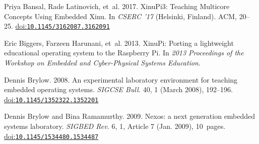 \begin{thebibliography}{11}

\ifx \showCODEN    \undefined {}     \fi
\ifx \showISBNx    \undefined \def \showISBNx     #1{\unskip}     \fi
\ifx \showISBNxiii \undefined \def \showISBNxiii  #1{\unskip}     \fi
\ifx \showISSN     \undefined \def \showISSN      #1{\unskip}     \fi
\ifx \showLCCN     \undefined \def \showLCCN      #1{\unskip}     \fi
\ifx \shownote     \undefined \def \shownote      #1{#1}          \fi
\ifx \showarticletitle \undefined \def \showarticletitle #1{#1}   \fi
\ifx \showURL      \undefined \def \showURL       {\relax}        \fi

\providecommand\bibfield[2]{#2}
\providecommand\bibinfo[2]{#2}
\providecommand\natexlab[1]{#1}
\providecommand\showeprint[2][]{arXiv:#2}

\bibfield{author}{\bibinfo{person}{Priya Bansal}, \bibinfo{person}{Rade Latinovich}, \bibinfo{person}{et~al}.} \bibinfo{year}{2017}\natexlab{}.
\newblock \showarticletitle{XinuPi3: Teaching Multicore Concepts Using Embedded Xinu}. In \bibinfo{booktitle}{\emph{CSERC '17}} (Helsinki, Finland). \bibinfo{publisher}{ACM}, \bibinfo{pages}{20–25}.
\newblock
\showISBNx{9781450363389}
\href{https://doi.org/10.1145/3162087.3162091}{doi:\nolinkurl{10.1145/3162087.3162091}}


\bibfield{author}{\bibinfo{person}{Eric Biggers}, \bibinfo{person}{Farzeen Harunani}, \bibinfo{person}{et~al}.} \bibinfo{year}{2013}\natexlab{}.
\newblock \showarticletitle{XinuPi: Porting a lightweight educational operating system to the Raspberry Pi}. In \bibinfo{booktitle}{\emph{2013 Proceedings of the Workshop on Embedded and Cyber-Physical Systems Education}}.
\newblock


\bibfield{author}{\bibinfo{person}{Dennis Brylow}.} \bibinfo{year}{2008}\natexlab{}.
\newblock \showarticletitle{An experimental laboratory environment for teaching embedded operating systems}.
\newblock \bibinfo{journal}{\emph{SIGCSE Bull.}} \bibinfo{volume}{40}, \bibinfo{number}{1} (\bibinfo{date}{March} \bibinfo{year}{2008}), \bibinfo{pages}{192–196}.
\newblock
\showISSN{0097-8418}
\href{https://doi.org/10.1145/1352322.1352201}{doi:\nolinkurl{10.1145/1352322.1352201}}


\bibfield{author}{\bibinfo{person}{Dennis Brylow} {and} \bibinfo{person}{Bina Ramamurthy}.} \bibinfo{year}{2009}\natexlab{}.
\newblock \showarticletitle{Nexos: a next generation embedded systems laboratory}.
\newblock \bibinfo{journal}{\emph{SIGBED Rev.}} \bibinfo{volume}{6}, \bibinfo{number}{1}, Article \bibinfo{articleno}{7} (\bibinfo{date}{Jan.} \bibinfo{year}{2009}), \bibinfo{numpages}{10}~pages.
\newblock
\href{https://doi.org/10.1145/1534480.1534487}{doi:\nolinkurl{10.1145/1534480.1534487}}



\end{thebibliography}
